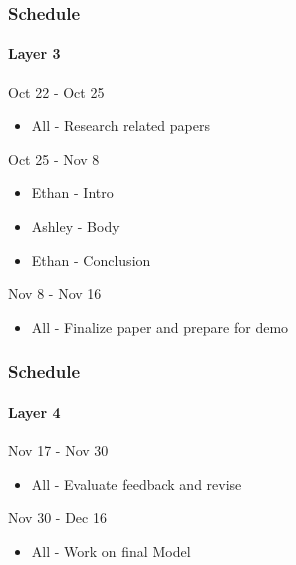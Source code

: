 \documentclass{beamer}
\begin{document}
\begin{frame}
\frametitle{Schedule}
\framesubtitle{Layer 3}
    Oct 22 - Oct 25
      \begin{itemize}
        \item All - Research related papers
      \end{itemize}

    Oct 25 - Nov 8
      \begin{itemize}
        \item Ethan - Intro
        \item Ashley - Body
        \item Ethan - Conclusion
      \end{itemize}

    Nov 8 - Nov 16
      \begin{itemize}
        \item All - Finalize paper and prepare for demo
      \end{itemize}
\end{frame}

\begin{frame}
\frametitle{Schedule}
\framesubtitle{Layer 4}
    Nov 17 - Nov 30
      \begin{itemize}
        \item All - Evaluate feedback and revise
       \end{itemize}

    Nov 30 - Dec 16
      \begin{itemize}
        \item All - Work on final Model
      \end{itemize}
\end{frame}
\end{document}
